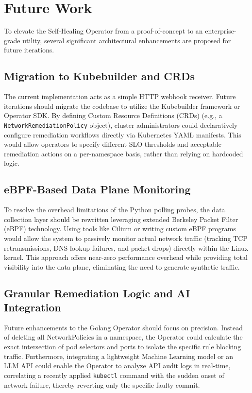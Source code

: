 \documentclass[12pt,a4paper]{article}
\begin{document}
\newpage

\section{Future Work}
\onehalfspacing
To elevate the Self-Healing Operator from a proof-of-concept to an enterprise-grade utility, several significant architectural enhancements are proposed for future iterations.

\subsection{Migration to Kubebuilder and CRDs}
The current implementation acts as a simple HTTP webhook receiver. Future iterations should migrate the codebase to utilize the Kubebuilder framework or Operator SDK. By defining Custom Resource Definitions (CRDs) (e.g., a \texttt{NetworkRemediationPolicy} object), cluster administrators could declaratively configure remediation workflows directly via Kubernetes YAML manifests. This would allow operators to specify different SLO thresholds and acceptable remediation actions on a per-namespace basis, rather than relying on hardcoded logic.

\subsection{eBPF-Based Data Plane Monitoring}
To resolve the overhead limitations of the Python polling probes, the data collection layer should be rewritten leveraging extended Berkeley Packet Filter (eBPF) technology. Using tools like Cilium or writing custom eBPF programs would allow the system to passively monitor actual network traffic (tracking TCP retransmissions, DNS lookup failures, and packet drops) directly within the Linux kernel. This approach offers near-zero performance overhead while providing total visibility into the data plane, eliminating the need to generate synthetic traffic.

\subsection{Granular Remediation Logic and AI Integration}
Future enhancements to the Golang Operator should focus on precision. Instead of deleting all NetworkPolicies in a namespace, the Operator could calculate the exact intersection of pod selectors and ports to isolate the specific rule blocking traffic. Furthermore, integrating a lightweight Machine Learning model or an LLM API could enable the Operator to analyze API audit logs in real-time, correlating a recently applied \texttt{kubectl} command with the sudden onset of network failure, thereby reverting only the specific faulty commit.
\end{document}
